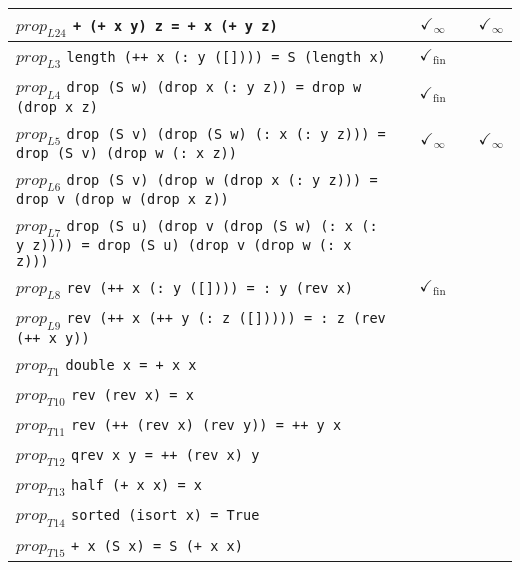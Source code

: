 \documentclass{article}
\begin{document}
\begin{longtable}{p{10cm} || c | c | c | c | }
\hline
$prop_{L24}$ \newline \verb`+ (+ x y) z = + x (+ y z)` &  & $\checkmark_{\infty}$ &  & $\checkmark_{\infty}$ \\
\hline
$prop_{L3}$ \newline \verb`length (++ x (: y ([]))) = S (length x)` &  & $\checkmark_{\mathrm{fin}}$ &  &  \\
\hline
$prop_{L4}$ \newline \verb`drop (S w) (drop x (: y z)) = drop w (drop x z)` &  & $\checkmark_{\mathrm{fin}}$ &  &  \\
\hline
$prop_{L5}$ \newline \verb`drop (S v) (drop (S w) (: x (: y z))) = drop (S v) (drop w (: x z))` &  & $\checkmark_{\infty}$ &  & $\checkmark_{\infty}$ \\
\hline
$prop_{L6}$ \newline \verb`drop (S v) (drop w (drop x (: y z))) = drop v (drop w (drop x z))` &  &  &  &  \\
\hline
$prop_{L7}$ \newline \verb`drop (S u) (drop v (drop (S w) (: x (: y z)))) = drop (S u) (drop v (drop w (: x z)))` &  &  &  &  \\
\hline
$prop_{L8}$ \newline \verb`rev (++ x (: y ([]))) = : y (rev x)` &  & $\checkmark_{\mathrm{fin}}$ &  &  \\
\hline
$prop_{L9}$ \newline \verb`rev (++ x (++ y (: z ([])))) = : z (rev (++ x y))` &  &  &  &  \\
\hline
$prop_{T1}$ \newline \verb`double x = + x x` &  &  &  &  \\
\hline
$prop_{T10}$ \newline \verb`rev (rev x) = x` &  &  &  &  \\
\hline
$prop_{T11}$ \newline \verb`rev (++ (rev x) (rev y)) = ++ y x` &  &  &  &  \\
\hline
$prop_{T12}$ \newline \verb`qrev x y = ++ (rev x) y` &  &  &  &  \\
\hline
$prop_{T13}$ \newline \verb`half (+ x x) = x` &  &  &  &  \\
\hline
$prop_{T14}$ \newline \verb`sorted (isort x) = True` &  &  &  &  \\
\hline
$prop_{T15}$ \newline \verb`+ x (S x) = S (+ x x)` &  &  &  &  \\

\end{longtable}
\end{document}
